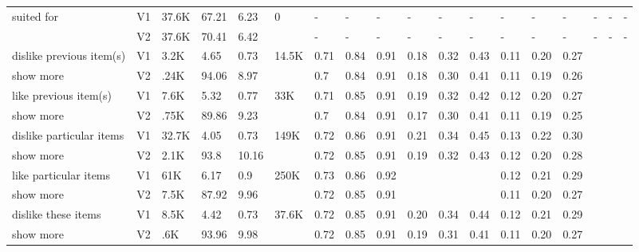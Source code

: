 \documentclass[letterpaper]{article} %
\begin{document}
\begin{table*}[!ht]
{\begin{tabular}{|m{2cm}|m{0.2cm}||m{0.4cm}|m{0.4cm}|m{0.4cm}||m{0.4cm}||m{0.4cm}|m{0.4cm}|m{0.4cm}||m{0.4cm}|m{0.4cm}|m{0.4cm}||m{0.4cm}|m{0.4cm}|m{0.4cm}||m{0.4cm}|m{0.4cm}|m{0.4cm}|}
\multirow{2}{1.8cm}{suited for} 
 & V1 & 37.6K	& 67.21	&6.23&	 \multirow{2}{*}{0}	&-	&-&	-& - &	 - &	-& - &	 - &	-& - &	 - &	-\\ \cline{2-5} \cline{7-18}
  & V2 & 37.6K &	70.41	& 6.42 &		& - &	- &	-& - &	 - &	-& - &	 - &	-& - &	 - &	-\\ \hline 
 

 dislike previous item(s) & V1 & 3.2K	& 4.65	& 0.73 &\multirow{2}{*}{14.5K} & 0.71	& 0.84	& 0.91 & 0.18 & 0.32 & 0.43	 & 0.11 & 0.20 & 0.27\\ \cline{2-5} \cline{7-18}
 show more& V2 & .24K	& 94.06 &	8.97 && 0.7 &	0.84 &	0.91 & 0.18 & 0.30 & 0.41 & 0.11 & 0.19 & 0.26 	\\ \hline 

 like previous item(s) & V1 & 7.6K	& 5.32 &	0.77	&\multirow{2}{*}{33K} & 0.71&	0.85 &	0.91 &  0.19 & 0.32 & 0.42  & 0.12 & 0.20 & 0.27\\ \cline{2-5} \cline{7-18}
  show more & V2 & .75K	& 89.86 &	9.23 & & 0.7& 	0.84 &	0.91 & 0.17 & 0.30 & 0.41 & 0.11 & 0.19 & 0.25\\  \hline 
 
dislike particular items& V1 & 32.7K	& 4.05	& 0.73	& \multirow{2}{*}{149K} & 0.72	& 0.86	& 0.91 & 0.21 & 0.34 & 0.45 & 0.13 & 0.22 & 0.30\\ \cline{2-5} \cline{7-18} 
 show more & V2 & 2.1K	& 93.8 &	10.16 &	&0.72	& 0.85	& 0.91 & 0.19 & 0.32 & 0.43 & 0.12 & 0.20 & 0.28 \\  \hline 

 like particular items & V1 & 61K	& 6.17 &	0.9	&\multirow{2}{*}{250K} & 0.73 &	0.86 &	0.92 & & & & 0.12 & 0.21 & 0.29 \\ \cline{2-5} \cline{7-18}
 show more  & V2 & 7.5K &	87.92 &	9.96 &  &0.72	& 0.85	& 0.91& & & & 0.11 & 0.20 & 0.27	\\ \hline 

dislike these items
& V1 & 8.5K	& 4.42	& 0.73	&\multirow{2}{*}{37.6K} & 0.72 &	0.85	& 0.91 & 0.20 & 0.34 & 0.44 & 0.12 & 0.21 & 0.29\\ \cline{2-5} \cline{7-18}  
show more & V2 & .6K	& 93.96	 & 9.98 &&0.72	& 0.85	& 0.91 & 0.19 & 0.31 &0.41 &  0.11 & 0.20 & 0.27	\\  \hline 


\end{tabular}}
\end{table*}
\end{document}
